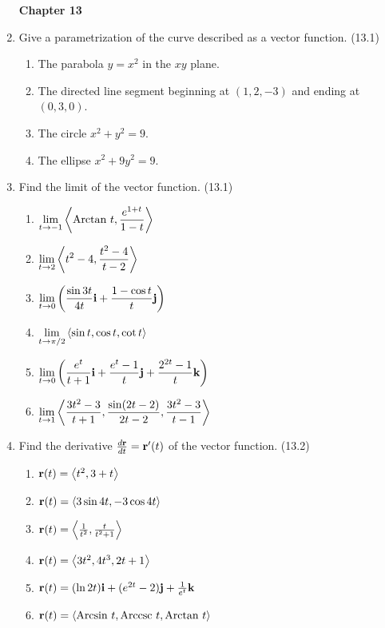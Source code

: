 \begin{enumerate}
\newpage
\centerline{\bf Chapter 13}

    \item Give a parametrization of the curve described as a vector function. (13.1)

      \begin{enumerate}
        \item The parabola $y=x^2$ in the $xy$ plane.
        \item The directed line segment beginning at $(1,2,-3)$ and ending at $(0,3,0)$.
        \item The circle $x^2+y^2=9$.
        \item The ellipse $x^2+9y^2=9$.
      \end{enumerate}

    \item Find the limit of the vector function. (13.1)

      \begin{enumerate}
        \item $\displaystyle\lim_{t\to -1} \left<\text{Arctan } t, \frac{e^{1+t}}{1-t}\right>$
        \item $\displaystyle\lim_{t\to 2} \left<t^2-4,\frac{t^2-4}{t-2}\right>$
        \item $\displaystyle\lim_{t\to 0} \left(\frac{\sin3t}{4t}\mathbf{i} + \frac{1-\cos t}{t}\mathbf{j}\right)$
        \item $\displaystyle\lim_{t\to \pi/2} \left<\sin t, \cos t, \cot t\right>$
        \item $\displaystyle\lim_{t\to 0} \left(\frac{e^t}{t+1}\mathbf{i}+\frac{e^{t}-1}{t}\mathbf{j}+\frac{2^{2t}-1}{t}\mathbf{k}\right)$
        \item $\displaystyle\lim_{t\to 1} \left<\frac{3t^2-3}{t+1}, \frac{\sin(2t-2)}{2t-2},\frac{3t^2-3}{t-1}\right>$
      \end{enumerate}

    \item Find the derivative $\frac{d\mathbf{r}}{dt}=\mathbf{r}'(t)$ of the vector function. (13.2)

      \begin{enumerate}
        \item $\mathbf{r}(t) = \left<t^2,3+t\right>$
        \item $\mathbf{r}(t) = \left<3\sin4t,-3\cos4t\right>$
        \item $\mathbf{r}(t) = \left<\frac{1}{t^2},\frac{t}{t^2+1}\right>$
        \item $\mathbf{r}(t) = \left<3t^2, 4t^3, 2t+1\right>$
        \item $\mathbf{r}(t) = (\ln 2t)\mathbf{i} + (e^{2t}-2)\mathbf{j} + \frac{1}{e^t}\mathbf{k}$
        \item $\mathbf{r}(t) = \left<\text{Arcsin } t, \text{Arccsc } t, \text{Arctan } t\right>$
      \end{enumerate}


\end{enumerate}
